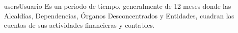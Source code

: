 \begin{cdtEntidad}{users}{Usuario}{
    Es un periodo de tiempo, generalmente de 12 meses donde las Alcaldías, Dependencias, Órganos Desconcentrados y Entidades, cuadran las cuentas de sus actividades financieras y contables.}




        

	   
\end{cdtEntidad}
